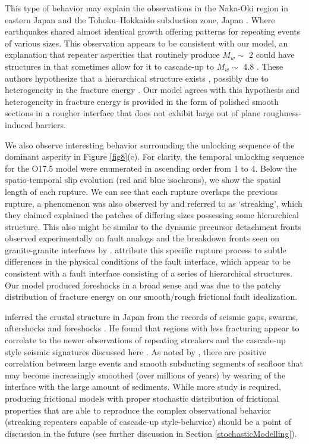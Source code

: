 \documentclass[preprint,1p, 10pt,authoryear]{elsarticle}
\begin{document}
This type of behavior may explain the observations in the Naka-Oki region in eastern Japan \citep{Okuda2018} and the Tohoku–Hokkaido subduction zone, Japan \citep{Ide2019}. Where earthquakes shared almost identical growth offering patterns for repeating events of various sizes. This observation appears to be consistent with our model, an explanation that repeater asperities that routinely produce  $M_{w} \sim$ 2 could have structures in that sometimes allow for it to cascade-up to $M_{w} \sim$ 4.8 \citep{Okuda2018a}.  These authors hypothesize that a hierarchical structure exists \citep[as depicted in fig. 5 of ][]{Okuda2018}, possibly due to heterogeneity in the fracture energy \citep{Ide2005, Aochi2014, Aochi2017}. Our model agrees with this hypothesis and heterogeneity in fracture energy is provided in the form of polished smooth sections in a rougher interface that does not exhibit large out of plane roughness-induced barriers. 

We also observe interesting behavior surrounding the unlocking sequence of the dominant asperity in Figure \ref{fig8}(c). For clarity, the temporal unlocking sequence for the O17.5 model were enumerated in ascending order from 1 to 4.  Below the spatio-temporal slip evolution (red and blue isochrons), we show the spatial length of each rupture. We can see that each rupture overlaps the previous rupture, a phenomenon was also observed by \citet{Okuda2018a} and referred to as `streaking', which they claimed explained the patches of differing sizes possessing some hierarchical structure. This also might be similar to the dynamic precursor detachment fronts observed experimentally on fault analogs \citep{Rubinstein2004,Rubinstein2006} and the breakdown fronts seen on granite-granite interfaces by \citep{Ke2018}. \citet{Okuda2018a} attribute this specific rupture process to subtle differences in the physical conditions of the fault interface, which appear to be consistent with a fault interface consisting of a series of hierarchical structures. Our model produced foreshocks in a broad sense \citep{Mogi1985} and was due to the patchy distribution of fracture energy on our smooth/rough frictional fault idealization. 

\citet{Mogi1963} inferred the crustal structure in Japan from the records of seismic gaps, swarms, aftershocks and foreshocks \citep[see also][]{Mogi1985}. He found that regions with less fracturing appear to correlate to the newer observations of repeating streakers and the cascade-up style seismic signatures discussed here \citep{Okuda2018,Okuda2018a,Ide2019}. As noted by \citet{Wang2014}, there are positive correlation between large events and smooth subducting segments of seafloor that may become increasingly smoothed (over millions of years) by wearing of the interface with the large amount of sediments.  While more study is required, producing frictional models with proper stochastic distribution of frictional properties that are able to reproduce the complex observational behavior (streaking repeaters capable of cascade-up style-behavior) should be a point of discussion in the future (see further discussion in Section \ref{stochasticModelling}).  
\end{document}
